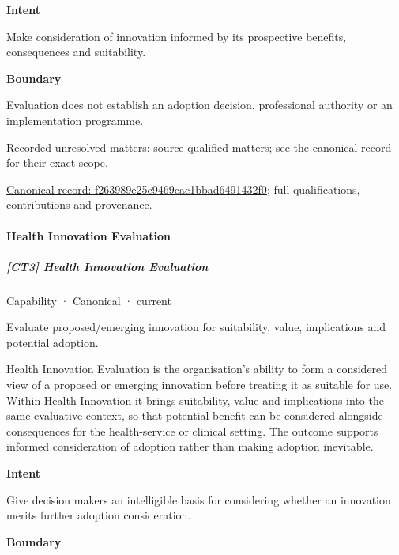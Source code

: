 \textbf{Intent}



Make consideration of innovation informed by its prospective benefits, consequences and suitability.



\textbf{Boundary}



Evaluation does not establish an adoption decision, professional authority or an implementation programme.


{\small Recorded unresolved matters: source-qualified matters; see the canonical record for their exact scope.}\par
{\footnotesize \href{../../../../continuum/strategy/capability/f263989e25c9469cac1bbad6491432f0.md}{Canonical record: f263989e25c9469cac1bbad6491432f0}; full qualifications, contributions and provenance.}\par
\paragraph{Health Innovation Evaluation}

\subparagraph{[CT3] Health Innovation Evaluation}

\label{element:adc555bcb54e4de290869c7deebd128c}
{\small Capability · Canonical · current}\par

Evaluate proposed/emerging innovation for suitability, value, implications and potential adoption.



Health Innovation Evaluation is the organisation's ability to form a considered view of a proposed or emerging innovation before treating it as suitable for use. Within Health Innovation it brings suitability, value and implications into the same evaluative context, so that potential benefit can be considered alongside consequences for the health-service or clinical setting. The outcome supports informed consideration of adoption rather than making adoption inevitable.



\textbf{Intent}



Give decision makers an intelligible basis for considering whether an innovation merits further adoption consideration.



\textbf{Boundary}



